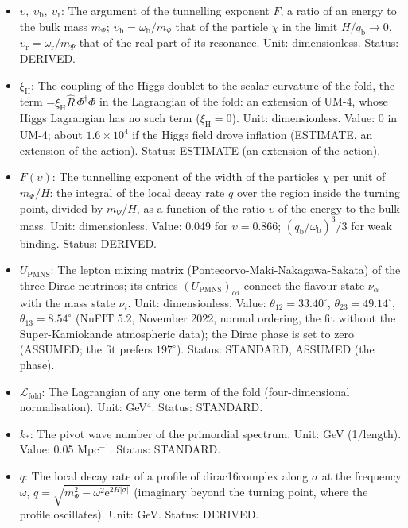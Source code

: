 \documentclass[
  10pt,
]{article}
\begin{document}
\begin{itemize}
  5.2, November 2022, normal ordering, the fit without the
  Super-Kamiokande atmospheric data); \(33.71^\circ\), \(8.56^\circ\),
  \(43.28^\circ\) in NuFIT 6.0 (2024, with the Super-Kamiokande
  atmospheric data; \(\sin^2\theta_{12} = 0.308\),
  \(\sin^2\theta_{13} = 0.02215\), \(\sin^2\theta_{23} = 0.470\)).
  Status: STANDARD.
\item
  \(\upsilon,\ \upsilon_{\mathrm{b}},\ \upsilon_{\mathrm{r}}\): The
  argument of the tunnelling exponent \(F\), a ratio of an energy to the
  bulk mass \(m_\Psi\);
  \(\upsilon_{\mathrm{b}} = \omega_{\mathrm{b}}/m_\Psi\) that of the
  particle \(\chi\) in the limit \(H/q_{\mathrm{b}} \to 0\),
  \(\upsilon_{\mathrm{r}} = \omega_{\mathrm{r}}/m_\Psi\) that of the
  real part of its resonance. Unit: dimensionless. Status: DERIVED.
\item
  \(\xi_{\mathrm{H}}\): The coupling of the Higgs doublet to the scalar
  curvature of the fold, the term
  \(-\xi_{\mathrm{H}}\hat R\,\Phi^\dagger\Phi\) in the Lagrangian of the
  fold: an extension of UM-4, whose Higgs Lagrangian has no such term
  (\(\xi_{\mathrm{H}} = 0\)). Unit: dimensionless. Value: 0 in UM-4;
  about \(1.6\times10^4\) if the Higgs field drove inflation (ESTIMATE,
  an extension of the action). Status: ESTIMATE (an extension of the
  action).
\item
  \(F(\upsilon)\): The tunnelling exponent of the width of the particles
  \(\chi\) per unit of \(m_\Psi/H\): the integral of the local decay
  rate \(q\) over the region inside the turning point, divided by
  \(m_\Psi/H\), as a function of the ratio \(\upsilon\) of the energy to
  the bulk mass. Unit: dimensionless. Value: 0.049 for
  \(\upsilon = 0.866\); \((q_{\mathrm{b}}/\omega_{\mathrm{b}})^3/3\) for
  weak binding. Status: DERIVED.
\item
  \(U_{\mathrm{PMNS}}\): The lepton mixing matrix
  (Pontecorvo-Maki-Nakagawa-Sakata) of the three Dirac neutrinos; its
  entries \((U_{\mathrm{PMNS}})_{\alpha i}\) connect the flavour state
  \(\nu_\alpha\) with the mass state \(\nu_i\). Unit: dimensionless.
  Value: \(\theta_{12} = 33.40^\circ\), \(\theta_{23} = 49.14^\circ\),
  \(\theta_{13} = 8.54^\circ\) (NuFIT 5.2, November 2022, normal
  ordering, the fit without the Super-Kamiokande atmospheric data); the
  Dirac phase is set to zero (ASSUMED; the fit prefers \(197^\circ\)).
  Status: STANDARD, ASSUMED (the phase).
\item
  \(\mathcal{L}_{\mathrm{fold}}\): The Lagrangian of any one term of the
  fold (four-dimensional normalisation). Unit: GeV\(^4\). Status:
  STANDARD.
\item
  \(k_*\): The pivot wave number of the primordial spectrum. Unit: GeV
  (1/length). Value: 0.05 Mpc\(^{-1}\). Status: STANDARD.
\item
  \(q\): The local decay rate of a profile of dirac16complex along
  \(\sigma\) at the frequency \(\omega\),
  \(q = \sqrt{m_\Psi^2 - \omega^2\mathrm{e}^{2H\lvert\sigma\rvert}}\)
  (imaginary beyond the turning point, where the profile oscillates).
  Unit: GeV. Status: DERIVED.
\end{itemize}
\end{document}
